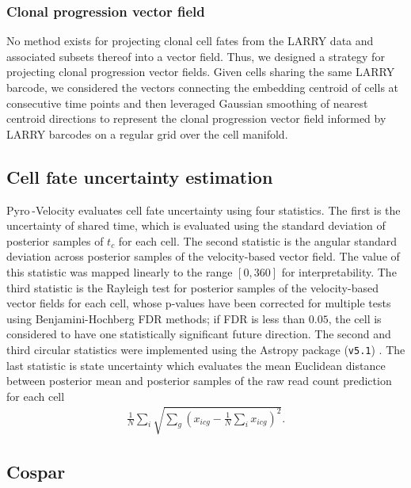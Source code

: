 \documentclass[
  sn-mathphys-num,
  lineno,
  twocolumn]{sn-jnl}
\begin{document}
\subsubsection{Clonal progression vector
field}\label{clonal-progression-vector-field}

No method exists for projecting clonal cell fates from the LARRY data
and associated subsets thereof into a vector field. Thus, we designed a
strategy for projecting clonal progression vector fields. Given cells
sharing the same LARRY barcode, we considered the vectors connecting the
embedding centroid of cells at consecutive time points and then
leveraged Gaussian smoothing of nearest centroid directions to represent
the clonal progression vector field informed by LARRY barcodes on a
regular grid over the cell manifold.

\subsection{Cell fate uncertainty
estimation}\label{sec-methods-fate-uncertainty}

Pyro -Velocity evaluates cell fate uncertainty using four statistics.
The first is the uncertainty of shared time, which is evaluated using
the standard deviation of posterior samples of \(t_c\) for each cell.
The second statistic is the angular standard deviation
\citep{Berens2009-fu} across posterior samples of the velocity-based
vector field. The value of this statistic was mapped linearly to the
range \([0, 360]\) for interpretability. The third statistic is the
Rayleigh test \citep{The-Astropy-Collaboration2022-aw} for posterior
samples of the velocity-based vector fields for each cell, whose
p-values have been corrected for multiple tests using Benjamini-Hochberg
FDR methods; if FDR is less than \(0.05\), the cell is considered to
have one statistically significant future direction. The second and
third circular statistics were implemented using the Astropy package
(\texttt{v5.1}) \citep{The-Astropy-Collaboration2022-aw}. The last
statistic is state uncertainty which evaluates the mean Euclidean
distance between posterior mean and posterior samples of the raw read
count prediction for each cell \begin{align*}
\frac{1}{N} \sum_{i} \sqrt{\sum_{g} \left(x_{icg} - \frac{1}{N}\sum_i x_{icg}\right)^2}.
\end{align*}

\subsection{Cospar}\label{sec-methods-cospar}
\end{document}
